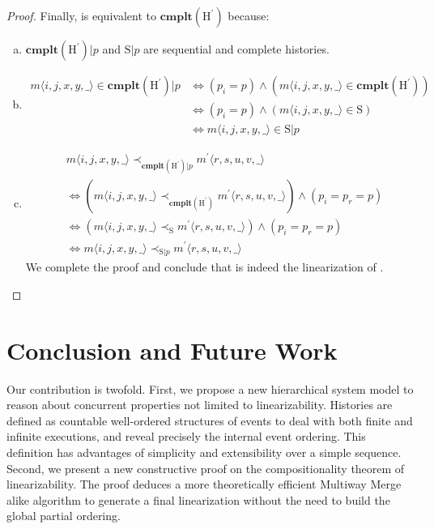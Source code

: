 \documentclass[a4paper,USenglish]{lipics-v2016}
\newcommand{\lin}{linearizability}
\newcommand{\linz}{linearization}
\newcommand{\cmplt}{\textbf{cmplt}}
\newcommand{\his}{\text{H}}
\newcommand{\shis}{\text{S}}
\newcommand{\myvert}{\vert}
\begin{document}
\begin{proof}
	Finally, {\shis} is equivalent to $\cmplt(\his^\prime)$ because:
	\begin{enumerate}[(a)]
		\item
		$\cmplt(\his^\prime) \myvert p$ and $\shis \myvert p$ are sequential and complete histories.
		\item
		\begin{align*}
		m \langle i, j, x, y, \_ \rangle \in \cmplt(\his^\prime) \myvert p &\iff (p_i = p) \land (m \langle i, j, x, y, \_ \rangle \in \cmplt(\his^\prime))\\
		&\iff (p_i = p) \land (m \langle i, j, x, y, \_ \rangle \in \shis)\\
		&\iff m \langle i, j, x, y, \_ \rangle \in \shis \myvert p
		\end{align*}
		\item
		\begin{align*}
		&m \langle i, j, x, y, \_ \rangle \prec_{\cmplt(\his^\prime) \myvert p} m^\prime \langle r, s, u, v, \_ \rangle\\
		&\iff (m \langle i, j, x, y, \_ \rangle \prec_{\cmplt(\his^\prime)} m^\prime \langle r, s, u, v, \_ \rangle) \land (p_i = p_r = p)\\
		&\iff (m \langle i, j, x, y, \_ \rangle \prec_{\shis} m^\prime \langle r, s, u, v, \_ \rangle) \land (p_i = p_r = p)\\
		&\iff m \langle i, j, x, y, \_ \rangle \prec_{\shis \myvert p} m^\prime \langle r, s, u, v, \_ \rangle
		\end{align*}
		We complete the proof and conclude that {\shis} is indeed the {\linz} of {\his}.
	\end{enumerate}
\end{proof}

\section{Conclusion and Future Work}\label{sec:discussion}
Our contribution is twofold.
First, we propose a new hierarchical system model to reason about concurrent properties not limited to {\lin}.
Histories are defined as countable well-ordered structures of events
to deal with both finite and infinite executions, and reveal precisely the internal event ordering.
This definition has advantages of simplicity and extensibility over a simple sequence. 
Second, we present a new constructive proof on the compositionality theorem of {\lin}.
The proof deduces a more theoretically efficient Multiway Merge alike algorithm to generate a final {\linz} without the need to build the global partial ordering.
\end{document}
